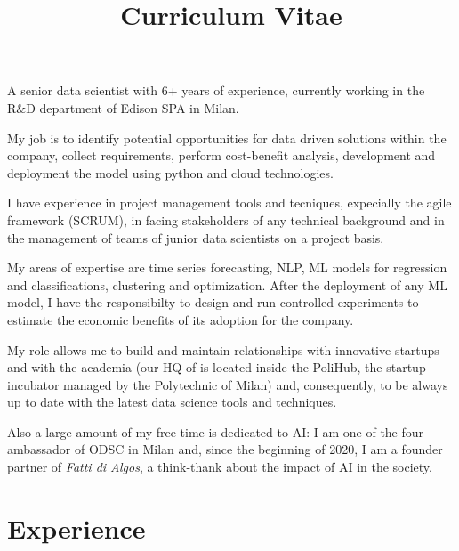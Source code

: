 \documentclass[11pt,a4paper,sans]{moderncv}        %
\title{Curriculum Vitae}                               %
\begin{document}
\makecvtitle
\small{A senior data scientist with 6+ years of experience, currently working in the R\&D department of Edison SPA in Milan.

My job is to identify potential opportunities for data driven solutions within the company, collect requirements, perform cost-benefit analysis, development and deployment the model using python and cloud technologies.

I have experience in project management tools and tecniques, expecially the agile framework (SCRUM), in facing stakeholders of any technical background and in the management of teams of junior data scientists on a project basis.

My areas of expertise are time series forecasting, NLP,  ML models for regression and classifications, clustering and optimization. After the deployment of any ML model, I have the responsibilty to design and run controlled experiments to estimate the economic benefits of its adoption for the company.

My role allows me to build and maintain relationships with innovative startups and with the academia (our HQ of is located inside the PoliHub, the startup incubator managed by the Polytechnic of Milan) and, consequently, to be always up to date with the latest data science tools and techniques.

Also a large amount of my free time is dedicated to AI: I am one of the four ambassador of ODSC in Milan and, since the beginning of 2020, I am a founder partner of \emph{Fatti di Algos}, a think-thank about the impact of AI in the society.}

\section{Experience}
\end{document}
